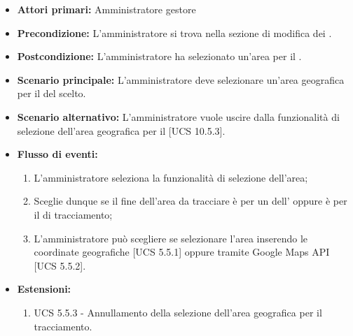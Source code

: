 \begin{itemize}
\item \textbf{Attori primari:} Amministratore gestore
\item \textbf{Precondizione:} L'amministratore si trova nella sezione di modifica dei .
\item \textbf{Postcondizione:} L'amministratore ha selezionato un'area per il .
\item \textbf{Scenario principale:} L'amministratore deve selezionare un'area geografica per il  del  scelto.
\item \textbf{Scenario alternativo:} L'amministratore vuole uscire dalla funzionalità di selezione dell'area geografica per il  [UCS 10.5.3].
\item \textbf{Flusso di eventi:}
\begin{enumerate}
    \item L'amministratore seleziona la funzionalità di selezione dell'area;
    \item Sceglie dunque se il fine dell'area da tracciare è per un  dell' oppure è per il  di tracciamento;
    \item L'amministratore può scegliere se selezionare l'area inserendo le coordinate geografiche [UCS 5.5.1] oppure tramite Google Maps API [UCS 5.5.2].
\end{enumerate}
\item \textbf{Estensioni:}
\begin{enumerate}
    \item UCS 5.5.3 - Annullamento della selezione dell'area geografica per il tracciamento.
\end{enumerate}
\end{itemize}

